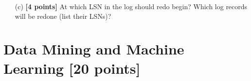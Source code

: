 \documentclass[10pt]{article}
\begin{document}
\begin{enumerate}
\begin{itemize}

		      \item[(c)] \textbf{[4 points]} At which LSN in the log should redo begin? Which log records will be redone (list their LSNs)?
	      \end{itemize}
\end{enumerate}


\newpage
\section{Data Mining and Machine Learning \textbf{[20 points]}}
\end{document}
